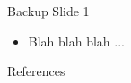 \documentclass[9pt,mathserif]{beamer}
\begin{document}
\begin{frame}[t]{Backup Slide 1}
	\begin{itemize} %
		\item Blah blah blah ...
	\end{itemize}
\end{frame}

\begin{frame}[allowframebreaks]{References}
	\tiny
	\def\newblock{}
\end{frame}

\setcounter{framenumber}{\value{finalframe}}
\end{document}
